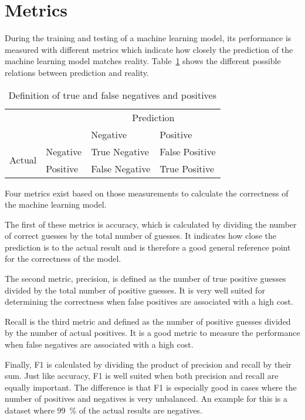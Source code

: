 \section{Metrics}\label{sec:metrics}
During the training and testing of a machine learning model, its performance is measured with different metrics which indicate how closely the prediction of the machine learning model matches reality. Table~\ref{table:true-false-neg-pos} shows the different possible relations between prediction and reality.

\begin{table}[ht]
  \centering
  \caption{Definition of true and false negatives and positives} %
  \begin{tabular}{ll|l|l} %
                            & \multicolumn{1}{c}{} & \multicolumn{2}{c}{Prediction}                  \\
                            &                      & Negative                       & Positive       \\ \cline{2-4}
    \multirow{2}{*}{Actual} & Negative             & True Negative                  & False Positive \\ \cline{2-4}
                            & Positive             & False Negative                 & True Positive  \\
  \end{tabular}\label{table:true-false-neg-pos}
\end{table}

Four metrics exist based on those measurements to calculate the correctness of the machine learning model.

The first of these metrics is accuracy, which is calculated by dividing the number of correct guesses by the total number of guesses. It indicates how close the prediction is to the actual result and is therefore a good general reference point for the correctness of the model.

The second metric, precision, is defined as the number of true positive guesses divided by the total number of positive guesses. It is very well suited for determining the correctness when false positives are associated with a high cost.

Recall is the third metric and defined as the number of positive guesses divided by the number of actual positives. It is a good metric to measure the performance when false negatives are associated with a high cost.

Finally, F1 is calculated by dividing the product of precision and recall by their sum. Just like accuracy, F1 is well suited when both precision and recall are equally important. The difference is that F1 is especially good in cases where the number of positives and negatives is very unbalanced. An example for this is a dataset where \SI{99}{\percent} of the actual results are negatives.
